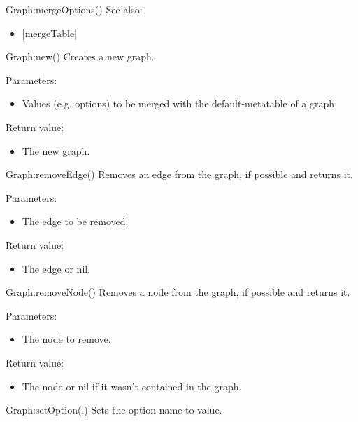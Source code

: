 \begin{luacommand}{{Graph:mergeOptions}()}
See also:
\begin{itemize}
	\item[] |mergeTable|
\end{itemize}

\end{luacommand}\begin{luacommand}{{Graph:new}()}
Creates a new graph.

Parameters:
\begin{itemize}
	\item[]  \subitem Values (e.g. options) to be merged with the default-metatable of a graph
\end{itemize}


Return value:
\begin{itemize} \item[] The new graph. \end{itemize}


\end{luacommand}\begin{luacommand}{{Graph:removeEdge}()}
Removes an edge from the graph, if possible and returns it.

Parameters:
\begin{itemize}
	\item[]  \subitem The edge to be removed.
\end{itemize}


Return value:
\begin{itemize} \item[] The edge or nil. \end{itemize}


\end{luacommand}\begin{luacommand}{{Graph:removeNode}()}
Removes a node from the graph, if possible and returns it.

Parameters:
\begin{itemize}
	\item[]  \subitem The node to remove.
\end{itemize}


Return value:
\begin{itemize} \item[] The node or nil if it wasn't contained in the graph. \end{itemize}


\end{luacommand}\begin{luacommand}{{Graph:setOption}(,)}
Sets the option name to value.


\end{luacommand}
